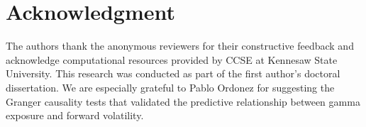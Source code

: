 \documentclass[conference]{IEEEtran}
\begin{document}














\section*{Acknowledgment}
The authors thank the anonymous reviewers for their constructive feedback and acknowledge computational resources provided by CCSE at Kennesaw State University. This research was conducted as part of the first author's doctoral dissertation. We are especially grateful to Pablo Ordonez for suggesting the Granger causality tests that validated the predictive relationship between gamma exposure and forward volatility.



\end{document}
